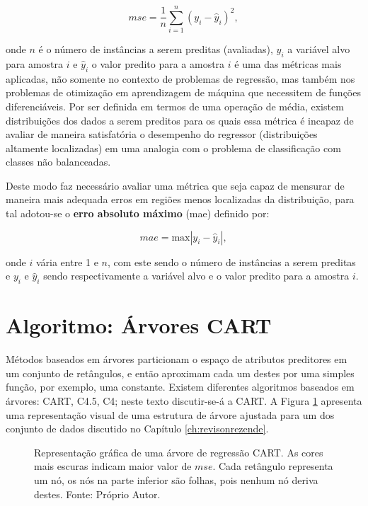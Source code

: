 \begin{equation}\label{eq:mse}
mse=\frac{1}{n}\sum_{i=1}^n(y_i-\hat{y}_i)^2\mbox{,}~
\end{equation}

onde $n$ é o número de instâncias a serem preditas (avaliadas), $y_i$ a variável alvo para amostra $i$ e $\hat{y}_i$ o valor predito para a amostra $i$ é uma das métricas mais aplicadas, não somente no contexto de problemas de regressão, mas também nos problemas de otimização em aprendizagem de máquina que necessitem de funções diferenciáveis. Por ser definida em termos de uma operação de média, existem distribuições dos dados a serem preditos para os quais essa métrica é incapaz de avaliar de maneira satisfatória o desempenho do regressor (distribuições altamente localizadas) em uma analogia com o problema de classificação com classes não balanceadas.

Deste modo faz necessário avaliar uma métrica que seja capaz de mensurar de maneira mais adequada erros em regiões menos localizadas da distribuição, para tal adotou-se o {\bf erro absoluto máximo} (mae) definido por:

\begin{equation}
mae=\mbox{max}|y_{i}-\hat{y}_i|\mbox{,}~
\end{equation}

onde $i$ vária entre 1 e $n$, com este sendo o número de instâncias a serem preditas e $y_i$ e $\hat{y}_i$ sendo respectivamente a variável alvo e o valor predito para a amostra $i$.

\section{Algoritmo: Árvores CART}

Métodos baseados em árvores particionam o espaço de atributos preditores em um conjunto de retângulos, e então aproximam cada um destes por uma simples função, por exemplo, uma constante. Existem diferentes algoritmos baseados em árvores: CART, C4.5, C4; neste texto discutir-se-á a CART. A Figura \ref{fig:tree} apresenta uma representação visual de uma estrutura de árvore ajustada para um dos conjunto de dados discutido no Capítulo \ref{ch:revisonrezende}.

\begin{figure}[H]
\centering
{}
\caption{Representação gráfica de uma árvore de regressão CART. As cores mais escuras indicam maior valor de $mse$. Cada retângulo representa um nó, os nós na parte inferior são folhas, pois nenhum nó deriva destes. Fonte: Próprio Autor.}
\label{fig:tree}
\end{figure}

